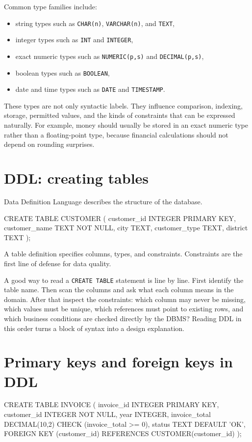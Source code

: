 \documentclass[11pt,a4paper,openany]{book}
\begin{document}
Common type families include:
\begin{itemize}
\item string types such as \texttt{CHAR(n)}, \texttt{VARCHAR(n)}, and \texttt{TEXT},
\item integer types such as \texttt{INT} and \texttt{INTEGER},
\item exact numeric types such as \texttt{NUMERIC(p,s)} and \texttt{DECIMAL(p,s)},
\item boolean types such as \texttt{BOOLEAN},
\item date and time types such as \texttt{DATE} and \texttt{TIMESTAMP}.
\end{itemize}

These types are not only syntactic labels. They influence comparison, indexing, storage, permitted values, and the kinds of constraints that can be expressed naturally. For example, money should usually be stored in an exact numeric type rather than a floating-point type, because financial calculations should not depend on rounding surprises.

\section{DDL: creating tables}
Data Definition Language describes the structure of the database.

\begin{codesql}
CREATE TABLE CUSTOMER (
  customer_id   INTEGER PRIMARY KEY,
  customer_name TEXT NOT NULL,
  city          TEXT,
  customer_type TEXT,
  district      TEXT
);
\end{codesql}

A table definition specifies columns, types, and constraints. Constraints are the first line of defense for data quality.

A good way to read a \texttt{CREATE TABLE} statement is line by line. First identify the table name. Then scan the columns and ask what each column means in the domain. After that inspect the constraints: which column may never be missing, which values must be unique, which references must point to existing rows, and which business conditions are checked directly by the DBMS? Reading DDL in this order turns a block of syntax into a design explanation.

\section{Primary keys and foreign keys in DDL}
\begin{codesql}
CREATE TABLE INVOICE (
  invoice_id     INTEGER PRIMARY KEY,
  customer_id    INTEGER NOT NULL,
  year           INTEGER,
  invoice_total  DECIMAL(10,2) CHECK (invoice_total >= 0),
  status         TEXT DEFAULT 'OK',
  FOREIGN KEY (customer_id) REFERENCES CUSTOMER(customer_id)
);
\end{codesql}
\end{document}
